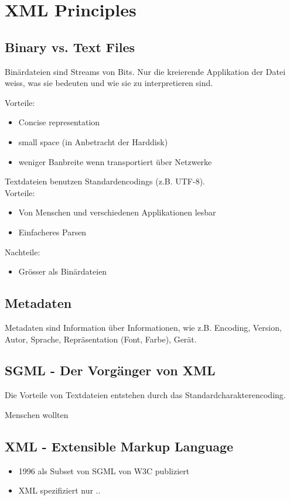 \chapter{XML Principles}
\section{Binary vs. Text Files}
Binärdateien sind Streams von Bits. Nur die kreierende Applikation der Datei weiss, was sie bedeuten und wie sie zu interpretieren sind.

Vorteile:\\
\begin{itemize}
\item Concise representation
\item small space (in Anbetracht der Harddisk)
\item weniger Banbreite wenn transportiert über Netzwerke
\end{itemize}

Textdateien benutzen Standardencodings (z.B. UTF-8).\\

Vorteile:
\begin{itemize}
\item Von Menschen und verschiedenen Applikationen lesbar
\item Einfacheres Parsen
\end{itemize}
Nachteile:
\begin{itemize}
\item Grösser als Binärdateien
\end{itemize}

\section{Metadaten}
Metadaten sind Information über Informationen, wie z.B. Encoding, Version, Autor, Sprache, Repräsentation (Font, Farbe), Gerät.


\section{SGML - Der Vorgänger von XML}

Die Vorteile von Textdateien entstehen durch das Standardcharakterencoding.

Menschen wollten 

\section{XML - Extensible Markup Language}
\begin{itemize}
\item 1996 als Subset von SGML von W3C publiziert
\item XML spezifiziert nur ..
\end{itemize}


